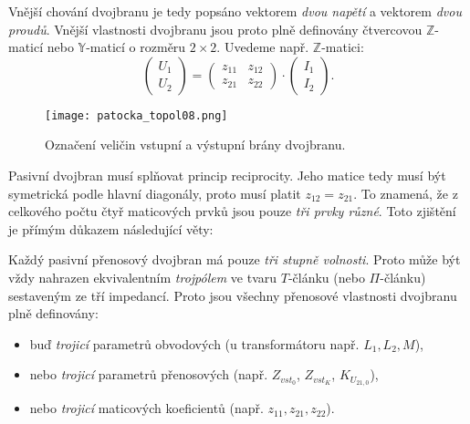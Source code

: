       Vnější chování dvojbranu je tedy popsáno vektorem \emph{dvou napětí} a vektorem \emph{dvou 
      proudů}. Vnější vlastnosti dvojbranu jsou proto plně definovány čtvercovou 
      \(\mathbb{Z}\)-maticí nebo  \(\mathbb{Y}\)-maticí o rozměru \(2\times2\). Uvedeme např. 
      \(\mathbb{Z}\)-matici:
      \begin{equation}\label{ES:eq_topol09}
        \left(
          \begin{array}{c}
            U_1 \\ U_2   
           \end{array}
        \right)
        =
        \left(
        \begin{array}{cc}
          z_{11}    &  z_{12}   \\
          z_{21}    &  z_{22}   
        \end{array}
        \right)
        \cdot
        \left(
          \begin{array}{c}
            I_1 \\ I_2 
          \end{array}
        \right).         
      \end{equation}
      
      \begin{figure}[ht!]
        \centering  
        \texttt{[image: patocka\_topol08.png]}
        \caption{Označení veličin vstupní a výstupní brány dvojbranu. \cite[s.~49]{Patocka4}} 
        \label{es:fig_patocka_topol08}
      \end{figure}
      
      Pasivní dvojbran musí splňovat princip reciprocity. Jeho matice tedy musí být symetrická 
      podle hlavní diagonály, proto musí platit \(z_{12} = z_{21}\). To znamená, že z celkového 
      počtu čtyř maticových prvků jsou pouze \emph{tři prvky různé}. Toto zjištění je přímým 
      důkazem následující věty:
      \begin{lemma}\label{ES:lem_topol02}
         Každý pasivní přenosový dvojbran má pouze \emph{tři stupně volnosti}. Proto může být vždy 
         nahrazen ekvivalentním \emph{trojpólem} ve tvaru \(T\)-článku (nebo \(\Pi\)-článku) 
         sestaveným ze tří impedancí. Proto jsou všechny přenosové vlastnosti dvojbranu plně 
         definovány:
         \begin{itemize}\addtolength{\itemsep}{-0.5\baselineskip}
            \item buď \emph{trojicí} parametrů obvodových (u transformátoru např. \(L_1, L_2, M\)),
            \item nebo \emph{trojicí} parametrů přenosových (např. \(Z_{vst_0}\), \(Z_{vst_K}\),    
                  \(K_{U_{21,0}}\)),
            \item nebo \emph{trojicí} maticových koeficientů (např. \(z_{11}, z_{21}, z_{22}\)).
          \end{itemize}
      \end{lemma}
      

